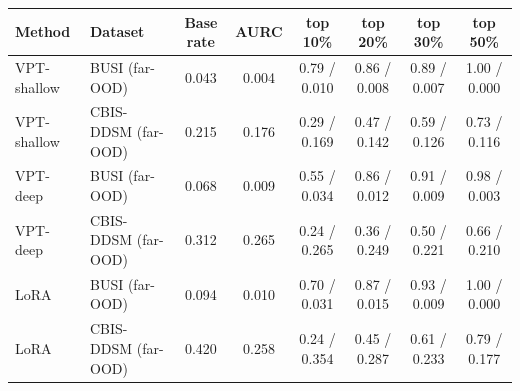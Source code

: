 \begin{tabular}{llcccccc}
\toprule
Method & Dataset & Base rate & AURC & top 10\% & top 20\% & top 30\% & top 50\% \\
\midrule
VPT-shallow & BUSI (far-OOD) & 0.043 & 0.004 & 0.79 / 0.010 & 0.86 / 0.008 & 0.89 / 0.007 & 1.00 / 0.000 \\
VPT-shallow & CBIS-DDSM (far-OOD) & 0.215 & 0.176 & 0.29 / 0.169 & 0.47 / 0.142 & 0.59 / 0.126 & 0.73 / 0.116 \\
VPT-deep & BUSI (far-OOD) & 0.068 & 0.009 & 0.55 / 0.034 & 0.86 / 0.012 & 0.91 / 0.009 & 0.98 / 0.003 \\
VPT-deep & CBIS-DDSM (far-OOD) & 0.312 & 0.265 & 0.24 / 0.265 & 0.36 / 0.249 & 0.50 / 0.221 & 0.66 / 0.210 \\
LoRA & BUSI (far-OOD) & 0.094 & 0.010 & 0.70 / 0.031 & 0.87 / 0.015 & 0.93 / 0.009 & 1.00 / 0.000 \\
LoRA & CBIS-DDSM (far-OOD) & 0.420 & 0.258 & 0.24 / 0.354 & 0.45 / 0.287 & 0.61 / 0.233 & 0.79 / 0.177 \\
\bottomrule
\end{tabular}
